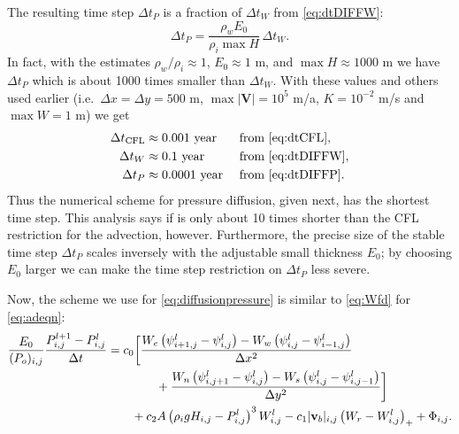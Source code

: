 \documentclass[11pt,final]{amsart}%
\newcommand\bv{\mathbf{v}}
\newcommand\bV{\mathbf{V}}
\newcommand{\Wlij}{W^l_{i,j}}
\newcommand{\Plij}{P^l_{i,j}}
\begin{document}
The resulting time step $\Delta t_P$ is a fraction of $\Delta t_W$ from \eqref{eq:dtDIFFW}:
\begin{equation}
\Delta t_P = \frac{\rho_w E_0}{\rho_i \max H}\, \Delta t_W.
\end{equation}
In fact, with the estimates $\rho_w/\rho_i \approx 1$, $E_0\approx 1$ m, and $\max H \approx 1000$ m we have $\Delta t_P$ which is about 1000 times smaller than $\Delta t_W$.  With these values and others used earlier (i.e.~$\Delta x = \Delta y = 500$ m, $\max |\bV|=10^5$ m/a, $K=10^{-2}$ m/s and $\max W=1$ m) we get
\begin{align*}
  \Delta t_{\text{CFL}} &\approx 0.001  \text{ year} &&\text{ from \eqref{eq:dtCFL}}, \\
  \Delta t_W            &\approx 0.1    \text{ year} &&\text{ from \eqref{eq:dtDIFFW}}, \\
  \Delta t_P            &\approx 0.0001 \text{ year} &&\text{ from \eqref{eq:dtDIFFP}.}
\end{align*}
Thus the numerical scheme for pressure diffusion, given next, has the shortest time step.  This analysis says if is only about 10 times shorter than the CFL restriction for the advection, however.  Furthermore, the precise size of the stable time step $\Delta t_P$ scales inversely with the adjustable small thickness $E_0$; by choosing $E_0$ larger we can make the time step restriction on $\Delta t_P$ less severe.

Now, the scheme we use for \eqref{eq:diffusionpressure} is similar to \eqref{eq:Wfd} for \eqref{eq:adeqn}:
\begin{align}
\frac{E_0}{(P_o)_{i,j}} \frac{P_{i,j}^{l+1} - \Plij}{\Delta t} &= c_0 \bigg[\frac{W_e \left(\psi_{i+1,j}^l - \psi_{i,j}^l\right) - W_w \left(\psi_{i,j}^l - \psi_{i-1,j}^l\right)}{\Delta x^2}  \label{eq:Pfd} \\
      &\qquad\qquad + \frac{W_n \left(\psi_{i,j+1}^l - \psi_{i,j}^l\right) - W_s \left(\psi_{i,j}^l - \psi_{i,j-1}^l\right)}{\Delta y^2}\bigg] \notag \\
      &\qquad + c_2 A \left(\rho_i g H_{i,j}- \Plij\right)^3 \Wlij - c_1 |\bv_b|_{i,j} \left(W_r - \Wlij\right)_+ + \Phi_{i,j}. \notag
\end{align}
\end{document}
